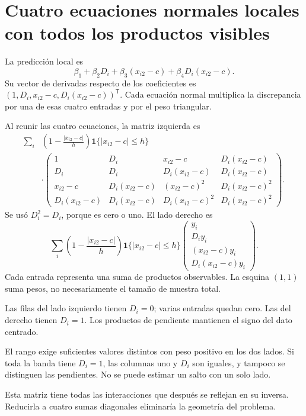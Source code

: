 \documentclass[11pt,a4paper]{article}
\newcommand{\T}{^{\mathsf T}}
\begin{document}
\clearpage
\section{Cuatro ecuaciones normales locales con todos los productos visibles}\label{unidad25}
La predicción local es
\[
\beta_1+\beta_2D_i+\beta_3(x_{i2}-c)
+\beta_4D_i(x_{i2}-c).
\]
Su vector de derivadas respecto de los coeficientes es
\((1,D_i,x_{i2}-c,D_i(x_{i2}-c))\T\).
Cada ecuación normal multiplica la discrepancia
por una de esas cuatro entradas y por el peso triangular.

Al reunir las cuatro ecuaciones, la matriz izquierda es
\[
\begin{aligned}
\sum_i&\left(1-\frac{|x_{i2}-c|}{h}\right)
\mathbf1\{|x_{i2}-c|\le h\}\\
&\cdot
\begin{pmatrix}
1&D_i&x_{i2}-c&D_i(x_{i2}-c)\\
D_i&D_i&D_i(x_{i2}-c)&D_i(x_{i2}-c)\\
x_{i2}-c&D_i(x_{i2}-c)&(x_{i2}-c)^2&D_i(x_{i2}-c)^2\\
D_i(x_{i2}-c)&D_i(x_{i2}-c)&D_i(x_{i2}-c)^2&D_i(x_{i2}-c)^2
\end{pmatrix}.
\end{aligned}
\]
Se usó \(D_i^2=D_i\), porque es cero o uno.
El lado derecho es
\[
\sum_i\left(1-\frac{|x_{i2}-c|}{h}\right)
\mathbf1\{|x_{i2}-c|\le h\}
\begin{pmatrix}
y_i\\D_iy_i\\(x_{i2}-c)y_i\\D_i(x_{i2}-c)y_i
\end{pmatrix}.
\]
Cada entrada representa una suma de productos
observables. La esquina \((1,1)\) suma pesos,
no necesariamente el tamaño de muestra total.

Las filas del lado izquierdo tienen
\(D_i=0\); varias entradas quedan cero.
Las del derecho tienen \(D_i=1\).
Los productos de pendiente mantienen
el signo del dato centrado.

El rango exige suficientes valores distintos
con peso positivo en los dos lados.
Si toda la banda tiene \(D_i=1\),
las columnas uno y \(D_i\) son iguales,
y tampoco se distinguen las pendientes.
No se puede estimar un salto con un solo lado.

Esta matriz tiene todas las interacciones
que después se reflejan en su inversa.
Reducirla a cuatro sumas diagonales
eliminaría la geometría del problema.

\clearpage
\end{document}
